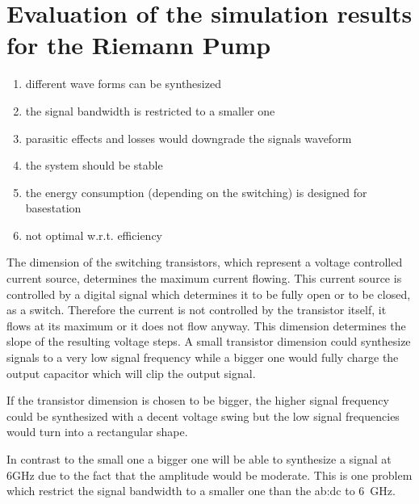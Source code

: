  


\section{Evaluation of the simulation results for the Riemann Pump}

\begin{enumerate}
	\item different wave forms can be synthesized
	\item the signal bandwidth is restricted to a smaller one
	\item parasitic effects and losses would downgrade the signals waveform
	\item the system should be stable
	\item the energy consumption (depending on the switching) is designed for basestation
	\item not optimal w.r.t. efficiency
\end{enumerate}


The dimension of the switching transistors, which represent a voltage controlled current source, determines the maximum current flowing.
This current source is controlled by a digital signal which determines it to be fully open or to be closed, as a switch.
Therefore the current is not controlled by the transistor itself, it flows at its maximum or it does not flow anyway.
This dimension determines the slope of the resulting voltage steps.
A small transistor dimension could synthesize signals to a very low signal frequency while a bigger one would fully charge the output capacitor which will clip the output signal.

If the transistor dimension is chosen to be bigger, the higher signal frequency could be synthesized with a decent voltage swing but the low signal frequencies would turn into a rectangular shape. 

In contrast to the small one a bigger one will be able to synthesize a signal at 6GHz due to the fact that the amplitude would be moderate.
This is one problem which restrict the signal bandwidth to a smaller one than the \gls{ab:dc} to \SI{6}{\GHz}.
\\




